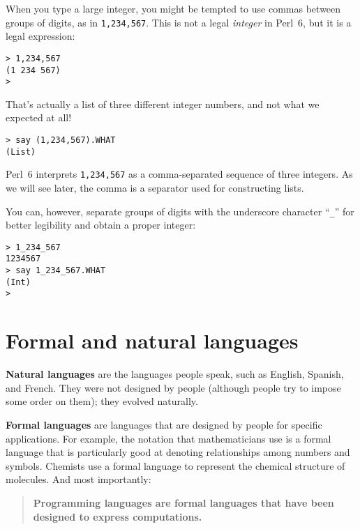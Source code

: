 When you type a large integer, you might be tempted to use commas
between groups of digits, as in {\tt 1,234,567}.  This is not a
legal {\em integer} in Perl~6, but it is a legal expression:

\begin{verbatim}
> 1,234,567
(1 234 567)
>
\end{verbatim}
%
That's actually a list of three different integer numbers, and 
not what we expected at all! 

\begin{verbatim}
> say (1,234,567).WHAT
(List)
\end{verbatim}

Perl~6 interprets {\tt 1,234,567} as a comma-separated 
sequence of three integers.  As we will see later, 
the comma is a separator used for constructing lists.

You can, however, separate groups of digits with the underscore character ``\verb"_"'' for better legibility and obtain a 
proper integer:

\begin{verbatim}
> 1_234_567
1234567
> say 1_234_567.WHAT
(Int)
>
\end{verbatim}
%




\section{Formal and natural languages}

{\bf Natural languages} are the languages people speak,
such as English, Spanish, and French.  They were not designed
by people (although people try to impose some order on them);
they evolved naturally.

{\bf Formal languages} are languages that are designed by people for
specific applications.  For example, the notation that mathematicians
use is a formal language that is particularly good at denoting
relationships among numbers and symbols.  Chemists use a formal
language to represent the chemical structure of molecules.  And
most importantly:

\begin{quote}
{\bf Programming languages are formal languages that have been
designed to express computations.}
\end{quote}

